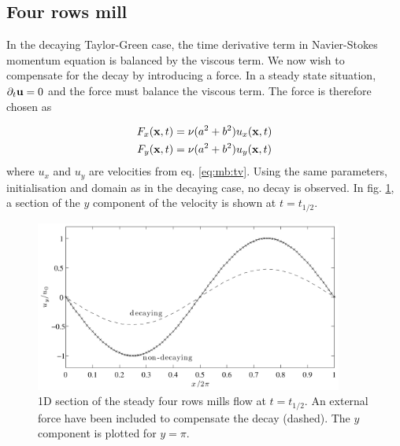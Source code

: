 \subsection{Four rows mill}\label{sec:mb:four_rows}
In the decaying Taylor-Green case, the time derivative term in
Navier-Stokes momentum equation is balanced by the viscous term. We
now wish to compensate for the decay by introducing a force. In a
steady state situation, $\partial_t\mathbf{u} = 0$ and the force must
balance the viscous term. The force is therefore chosen as

\begin{equation}
\begin{aligned}
F_x(\mathbf{x}, t) &= \nu(a^2 + b^2)u_x(\mathbf{x}, t) \\
F_y(\mathbf{x}, t) &= \nu(a^2 + b^2)u_y(\mathbf{x}, t) 
\end{aligned}
\end{equation}
where $u_x$ and $u_y$ are velocities from eq. \eqref{eq:mb:tv}. Using
the same parameters, initialisation and domain as in the decaying
case, no decay is observed. In fig. \ref{fig:mb:four_mill}, a section
of the $y$ component of the velocity is shown at $t = t_{1/2}$.

\begin{figure}
\begin{center}
\includegraphics[width=0.9\textwidth]{fig/four_mill.pdf}
\end{center}
\caption{1D section of the steady four rows mills flow at $t =
  t_{1/2}$. An external force have been included to compensate the
  decay (dashed). The $y$ component is plotted for $y = \pi$. }
\label{fig:mb:four_mill}
\end{figure}

